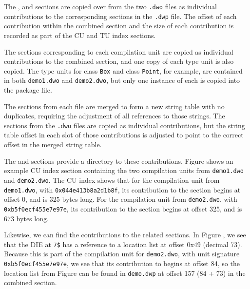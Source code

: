 The \dotdebugabbrevdwo{}, \dotdebuglocdwo{} and \dotdebuglinedwo{}
sections are copied over from the two \texttt{.dwo} files as
individual contributions to the corresponding sections in the
\texttt{.dwp} file. 
The offset of each contribution within 
the combined section and the size of each contribution is recorded
as part of the CU and TU index sections.

The \dotdebuginfodwo{} sections corresponding to each compilation 
unit are copied as individual contributions to the combined
\dotdebuginfodwo{} section, and one copy of each type unit 
is also copied. The type units for class \texttt{Box} and class 
\texttt{Point}, for example, are contained in both \texttt{demo1.dwo} 
and \texttt{demo2.dwo}, but only one instance of each is copied into 
the package file.

The \dotdebugstrdwo{} sections from each file are merged to
form a new string table with no duplicates, requiring the
adjustment of all references to those strings. The
\dotdebugstroffsetsdwo{} sections from the \texttt{.dwo} files 
are copied as individual contributions, but the string table offset
in each slot of those contributions is adjusted to point to
the correct offset in the merged string table.

The \dotdebugcuindex{} and \dotdebugtuindex{} sections provide a
directory to these contributions. 
Figure  shows an example CU
index section containing the two compilation units from 
\texttt{demo1.dwo} and \texttt{demo2.dwo}. The CU index shows that 
for the compilation unit from \texttt{demo1.dwo}, with \CUsignature{} 
\texttt{0x044e413b8a2d1b8f}, its contribution to the \dotdebuginfodwo{} 
section begins at offset 0, and is 325 bytes long. For the compilation 
unit from \texttt{demo2.dwo}, with \CUsignature{} 
\texttt{0xb5f0ecf455e7e97e}, its contribution to the \dotdebuginfodwo{}
section begins at offset 325, and is 673 bytes long.

Likewise, we can find the contributions to the related sections.
In Figure , 
we see that the \DWTAGvariable{} DIE at \texttt{7\$} has a
reference to a location list at offset 0x49 (decimal 73). Because
this is part of the compilation unit for \texttt{demo2.dwo}, with 
unit signature \texttt{0xb5f0ecf455e7e97e}, we see that its contribution 
to \dotdebuglocdwo{} begins at offset 84, so the location list from
Figure  
can be found in \texttt{demo.dwp} at offset 157 (84 + 73) in
the combined \dotdebuglocdwo{} section.

